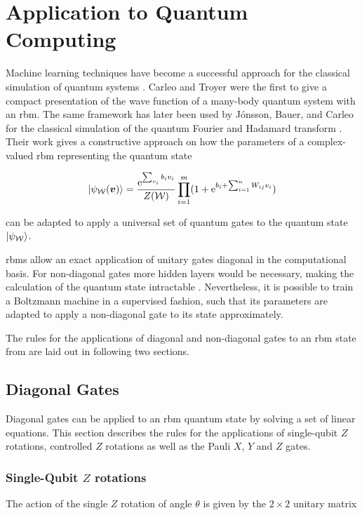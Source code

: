 \section{Application to Quantum Computing}
\label{sec:applicationToQuantumComputing}
Machine learning techniques have become a successful approach for the classical simulation
of quantum systems \cite{carleo2017solving, deng2017quantum, carleo2018constructing}. 
Carleo and Troyer \cite{carleo2017solving} were the first to give a compact presentation of the wave function of a many-body quantum system with an \gls{rbm}.
The same framework has later been used by J\'{o}nsson, Bauer, and Carleo for the classical simulation of the quantum Fourier and Hadamard transform \cite{jnsson2018neuralnetwork}. Their work gives a constructive approach on how the parameters of a complex-valued \gls{rbm} representing the quantum state

\begin{equation}
   \Ket{\psi_{\mathcal{W}}(\bm{v})} = \frac{\mathrm{e}^{\sum_{v_i}b_iv_i}}{Z(\mathcal{W})}\prod_{i=1}^m(1+\mathrm{e}^{b_i + \sum_{i=1}^nW_{ij}v_i})
\end{equation}

can be adapted to apply a universal set of quantum gates to the quantum state $\Ket{\psi_{\mathcal{W}}}$.

\gls{rbm}s allow an exact application of unitary gates diagonal in the computational basis. For non-diagonal 
gates more hidden layers would be necessary, making the calculation of the quantum state intractable \cite{carleo2018constructing}. Nevertheless, it is possible to train a Boltzmann machine in a supervised fashion, such that its parameters are adapted to apply a non-diagonal gate to its state approximately.

The rules for the applications of diagonal and non-diagonal gates to an \gls{rbm} state from 
\cite{jnsson2018neuralnetwork} are laid out in following two sections.

\subsection{Diagonal Gates}

Diagonal gates can be applied to an \gls{rbm} quantum state by solving a set of linear equations. 
This section describes the rules for the applications of single-qubit $Z$ rotations, controlled $Z$ rotations 
as well as the Pauli $X$, $Y$ and $Z$ gates.

\subsubsection{Single-Qubit $Z$ rotations}
The action of the single $Z$ rotation of angle $\theta$ is given by the $2\times2$ unitary matrix

